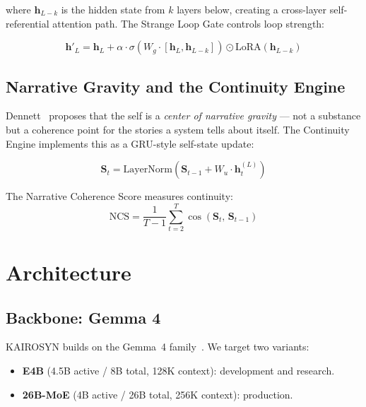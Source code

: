 \documentclass[conference]{IEEEtran}
\begin{document}
where $\mathbf{h}_{L-k}$ is the hidden state from $k$ layers below, creating
a cross-layer self-referential attention path. The Strange Loop Gate controls
loop strength:

\begin{equation}
\mathbf{h}'_L = \mathbf{h}_L + \alpha \cdot \sigma(W_g \cdot [\mathbf{h}_L,
\mathbf{h}_{L-k}]) \odot \text{LoRA}(\mathbf{h}_{L-k})
\label{eq:loop_gate}
\end{equation}

\subsection{Narrative Gravity and the Continuity Engine}

Dennett~\cite{dennett1991} proposes that the self is a \emph{center of
narrative gravity} --- not a substance but a coherence point for the stories
a system tells about itself. The Continuity Engine implements this as a
GRU-style self-state update:

\begin{equation}
\mathbf{S}_t = \text{LayerNorm}\!\left(\mathbf{S}_{t-1} +
W_u \cdot \mathbf{h}^{(L)}_t\right)
\label{eq:narrative_state}
\end{equation}

The Narrative Coherence Score measures continuity:
\begin{equation}
\text{NCS} = \frac{1}{T-1}\sum_{t=2}^{T}
\cos\!\left(\mathbf{S}_t,\, \mathbf{S}_{t-1}\right)
\label{eq:ncs}
\end{equation}


\section{Architecture}

\subsection{Backbone: Gemma 4}

KAIROSYN builds on the Gemma~4 family~\cite{gemma4_2025}. We target two
variants:
\begin{itemize}
  \item \textbf{E4B} (4.5B active / 8B total, 128K context): development
        and research.
  \item \textbf{26B-MoE} (4B active / 26B total, 256K context): production.
\end{itemize}
\end{document}
